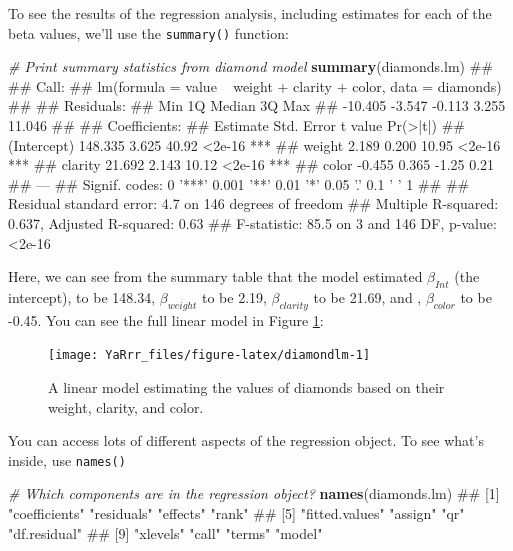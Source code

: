 \documentclass[]{book}
\newenvironment{Shaded}{\begin{snugshade}}{\end{snugshade}}
\newcommand{\KeywordTok}[1]{\textcolor[rgb]{0.13,0.29,0.53}{\textbf{#1}}}
\newcommand{\CommentTok}[1]{\textcolor[rgb]{0.56,0.35,0.01}{\textit{#1}}}
\newcommand{\NormalTok}[1]{#1}
\theoremstyle{definition}
\theoremstyle{definition}
\theoremstyle{remark}
\begin{document}
To see the results of the regression analysis, including estimates for
each of the beta values, we'll use the \texttt{summary()} function:

\begin{Shaded}
\begin{Highlighting}[]
\CommentTok{# Print summary statistics from diamond model}
\KeywordTok{summary}\NormalTok{(diamonds.lm)}
\NormalTok{## }
\NormalTok{## Call:}
\NormalTok{## lm(formula = value ~ weight + clarity + color, data = diamonds)}
\NormalTok{## }
\NormalTok{## Residuals:}
\NormalTok{##     Min      1Q  Median      3Q     Max }
\NormalTok{## -10.405  -3.547  -0.113   3.255  11.046 }
\NormalTok{## }
\NormalTok{## Coefficients:}
\NormalTok{##             Estimate Std. Error t value Pr(>|t|)    }
\NormalTok{## (Intercept)  148.335      3.625   40.92   <2e-16 ***}
\NormalTok{## weight         2.189      0.200   10.95   <2e-16 ***}
\NormalTok{## clarity       21.692      2.143   10.12   <2e-16 ***}
\NormalTok{## color         -0.455      0.365   -1.25     0.21    }
\NormalTok{## ---}
\NormalTok{## Signif. codes:  0 '***' 0.001 '**' 0.01 '*' 0.05 '.' 0.1 ' ' 1}
\NormalTok{## }
\NormalTok{## Residual standard error: 4.7 on 146 degrees of freedom}
\NormalTok{## Multiple R-squared:  0.637,  Adjusted R-squared:  0.63 }
\NormalTok{## F-statistic: 85.5 on 3 and 146 DF,  p-value: <2e-16}
\end{Highlighting}
\end{Shaded}

Here, we can see from the summary table that the model estimated
\(\beta_{Int}\) (the intercept), to be 148.34, \(\beta_{weight}\) to be
2.19, \(\beta_{clarity}\) to be 21.69, and , \(\beta_{color}\) to be
-0.45. You can see the full linear model in Figure \ref{fig:diamondlm}:

\begin{figure}

{\centering \texttt{[image: YaRrr\_files/figure-latex/diamondlm-1]} 

}

\caption{A linear model estimating the values of diamonds based on their weight, clarity, and color.}\label{fig:diamondlm}
\end{figure}

You can access lots of different aspects of the regression object. To
see what's inside, use \texttt{names()}

\begin{Shaded}
\begin{Highlighting}[]
\CommentTok{# Which components are in the regression object?}
\KeywordTok{names}\NormalTok{(diamonds.lm)}
\NormalTok{##  [1] "coefficients"  "residuals"     "effects"       "rank"         }
\NormalTok{##  [5] "fitted.values" "assign"        "qr"            "df.residual"  }
\NormalTok{##  [9] "xlevels"       "call"          "terms"         "model"}
\end{Highlighting}
\end{Shaded}
\end{document}
